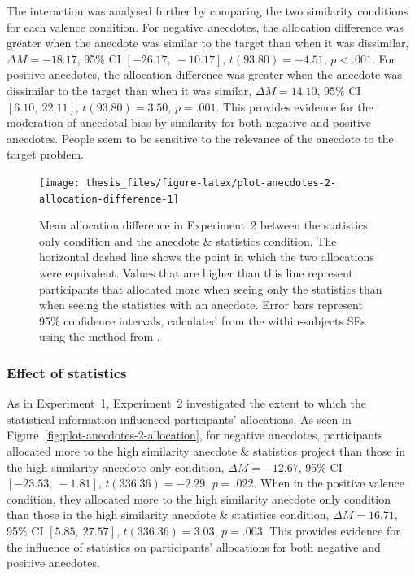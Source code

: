 \documentclass[a4paper, nobind, dvipsnames]{templates/ociamthesis}
\theoremstyle{definition}
\theoremstyle{definition}
\theoremstyle{definition}
\theoremstyle{definition}
\theoremstyle{remark}
\begin{document}
The interaction was analysed further by comparing the two similarity conditions
for each valence condition. For negative anecdotes, the allocation difference
was greater when the anecdote was similar to the target than when it was
dissimilar, \(\Delta M = -18.17\), 95\% CI \([-26.17,~-10.17]\), \(t(93.80) = -4.51\), \(p < .001\). For
positive anecdotes, the allocation difference was greater when the anecdote was
dissimilar to the target than when it was similar,
\(\Delta M = 14.10\), 95\% CI \([6.10,~22.11]\), \(t(93.80) = 3.50\), \(p = .001\). This provides
evidence for the moderation of anecdotal bias by similarity for both negative
and positive anecdotes. People seem to be sensitive to the relevance of the
anecdote to the target problem.



\begin{figure}
\texttt{[image: thesis\_files/figure-latex/plot-anecdotes-2-allocation-difference-1]} \caption{Mean allocation difference in Experiment~2 between the statistics only condition and the anecdote \& statistics condition. The horizontal dashed line shows the point in which the two allocations were equivalent. Values that are higher than this line represent participants that allocated more when seeing only the statistics than when seeing the statistics with an anecdote. Error bars represent 95\% confidence intervals, calculated from the within-subjects SEs using the method from \textcite{cousineau2014}.}\label{fig:plot-anecdotes-2-allocation-difference}
\end{figure}

\subsubsection{Effect of statistics}

As in Experiment~1, Experiment~2 investigated the extent to which the
statistical information influenced participants' allocations. As seen in
Figure~\ref{fig:plot-anecdotes-2-allocation}, for negative anecdotes,
participants allocated more to the high similarity anecdote \& statistics project
than those in the high similarity anecdote only condition,
\(\Delta M = -12.67\), 95\% CI \([-23.53,~-1.81]\), \(t(336.36) = -2.29\), \(p = .022\).
When in the positive valence condition, they allocated more to the high
similarity anecdote only condition than those in the high similarity anecdote \&
statistics condition,
\(\Delta M = 16.71\), 95\% CI \([5.85,~27.57]\), \(t(336.36) = 3.03\), \(p = .003\).
This provides evidence for the influence of statistics on participants'
allocations for both negative and positive anecdotes.
\end{document}
